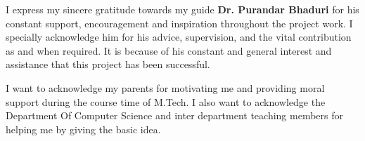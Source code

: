 

\begin{acknowledgements}



I express my sincere gratitude towards my guide \textbf{Dr. Purandar Bhaduri} for his constant support, encouragement and inspiration throughout the project work. I specially acknowledge him for his advice, supervision, and the vital contribution as and when required. It is because of his constant and general interest and assistance that this project has been successful. 

I want to acknowledge my parents for motivating me and providing moral support during the course time of M.Tech. I also want to acknowledge the Department Of Computer Science  and inter department teaching members for helping me by giving the basic idea.


\end{acknowledgements}

